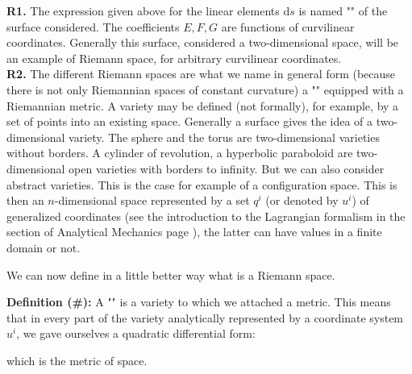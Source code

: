	\begin{tcolorbox}[title=Remarks,colframe=black,arc=10pt]
	\textbf{R1.} The expression given above for the linear elements $\mathrm{d}s$ is named "" of the surface considered. The coefficients $E, F, G$ are functions of curvilinear coordinates. Generally this surface, considered a two-dimensional space, will be an example of Riemann space, for arbitrary curvilinear coordinates.\\
	
	\textbf{R2.} The different Riemann spaces are what we name in general form (because there is not only Riemannian spaces of constant curvature) a "" equipped with a Riemannian metric. A variety may be defined (not formally), for example, by a set of points into an existing space. Generally a surface gives the idea of a two-dimensional variety. The sphere and the torus are two-dimensional varieties without borders. A cylinder of revolution, a hyperbolic paraboloid are two-dimensional open varieties with borders to infinity. But we can also consider abstract varieties. This is the case for example of a configuration space. This is then an $n$-dimensional space represented by a set $q^i$ (or denoted by $u^i$) of generalized coordinates (see the introduction to the Lagrangian formalism in the section of Analytical Mechanics page \pageref{lagrangian formalism}), the latter can have values in a finite domain or not.
	\end{tcolorbox}
	
	We can now define in a little better way what is a Riemann space.
	
	\textbf{Definition (\#\mydef):}	A "" is a variety to which we attached a metric. This means that in every part of the variety analytically represented by a coordinate system $u^i$, we gave ourselves a quadratic differential form:
	
	which is the metric of space.
	
